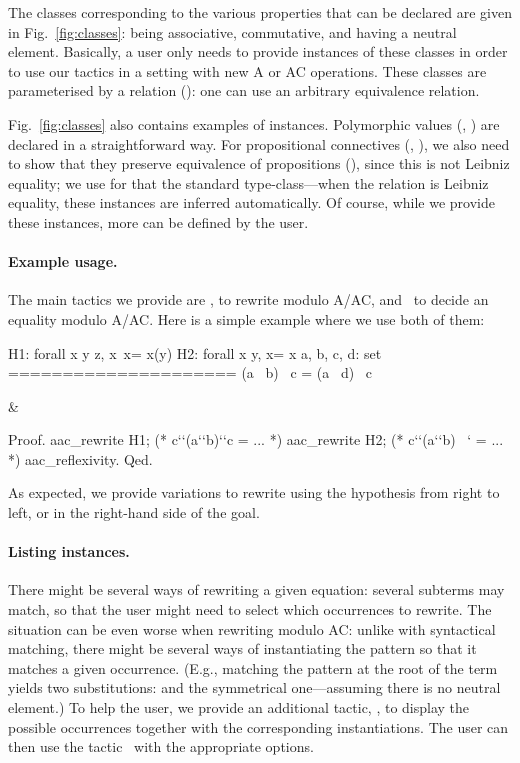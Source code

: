 \documentclass{llncs}
\begin{document}
The classes corresponding to the various properties that can be
declared are given in Fig.~\ref{fig:classes}: being associative,
commutative, and having a neutral element.  Basically, a user only
needs to provide instances of these classes in order to use our
tactics in a setting with new A or AC operations.  These classes are
parameterised by a relation (): one can use an arbitrary
equivalence relation.

Fig.~\ref{fig:classes} also contains examples of instances. 
Polymorphic values (, ) are declared in a
straightforward way. For propositional connectives (,
), we also need to show that they preserve equivalence of
propositions (), since this is not Leibniz equality; we use
for that the standard  type-class---when the relation
 is Leibniz equality, these instances are inferred
automatically.
Of course, while we provide these instances, more can be defined by
the user.

\paragraph{Example usage.}

The main tactics we provide are \aacrewrite, to rewrite modulo
A/AC, and \aacreflexivity\, to decide an equality modulo A/AC.
Here is a simple example where we use both of them:
\begin{twolistings}
\begin{coq}
H1: forall x y z, x\capy \cup~x\capz = x\cap(y\cupz)
H2: forall x y, x\capx = x
a, b, c, d: set
=====================
(a\capc \cup~ b\capc\capd) \cap~c = (a \cup~d\capb) \cap~c
\end{coq}&
\begin{coq}
Proof.
 aac_rewrite H1; (* c`\cap`(a`\cup`b\capd)`\cap`c = ... *)
 aac_rewrite H2; (* c`\cap`(a`\cup`b\capd) \tab~`  = ... *)
 aac_reflexivity.
Qed.
\end{coq}
\end{twolistings}
\noindent
As expected, we provide variations to rewrite using the hypothesis
from right to left, or in the right-hand side of the goal.

\paragraph{Listing instances.} 

There might be several ways of rewriting a given equation: several
subterms may match, so that the user might need to select which
occurrences to rewrite. The situation can be even worse when rewriting
modulo AC: unlike with syntactical matching, there might be several
ways of instantiating the pattern so that it matches a given
occurrence. (E.g., matching the pattern  at the root of the
term  yields two substitutions: 
and the symmetrical one---assuming there is no neutral element.)  To
help the user, we provide an additional tactic, \aacinstances, to
display the possible occurrences together with the corresponding
instantiations. The user can then use the tactic \aacrewrite\ with the
appropriate options.
\end{document}
